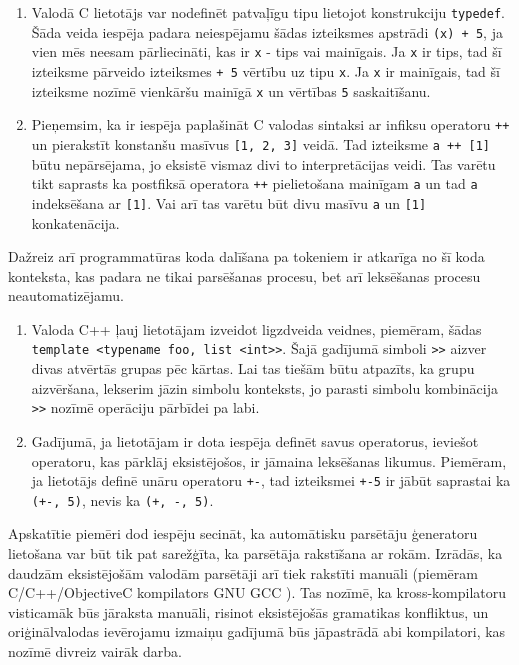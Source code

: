 \begin{enumerate}
\item
Valodā C lietotājs var nodefinēt patvaļīgu tipu lietojot konstrukciju \verb|typedef|. Šāda veida iespēja padara neiespējamu šādas izteiksmes apstrādi \verb|(x) + 5|, ja vien mēs neesam pārliecināti, kas ir \verb|x| - tips vai mainīgais. Ja \verb|x| ir tips, tad šī izteiksme pārveido izteiksmes \verb|+ 5| vērtību uz tipu \verb|x|. Ja \verb|x| ir mainīgais, tad šī izteiksme nozīmē vienkāršu mainīgā \verb|x| un vērtības \verb|5| saskaitīšanu. 
\item
Pieņemsim, ka ir iespēja paplašināt C valodas sintaksi ar infiksu operatoru \verb|++| un pierakstīt konstanšu masīvus \verb|[1, 2, 3]| veidā. Tad izteiksme \verb|a ++ [1]| būtu nepārsējama, jo eksistē vismaz divi to interpretācijas veidi. Tas varētu tikt saprasts ka postfiksā operatora \verb|++| pielietošana mainīgam \verb|a| un tad \verb|a| indeksēšana ar \verb|[1]|. Vai arī tas varētu būt divu masīvu \verb|a| un \verb|[1]| konkatenācija.
\end{enumerate}

Dažreiz arī programmatūras koda dalīšana pa tokeniem ir atkarīga no šī koda konteksta, kas padara ne tikai parsēšanas procesu, bet arī leksēšanas procesu neautomatizējamu.

\begin{enumerate}
\item
Valoda C++ ļauj lietotājam izveidot ligzdveida veidnes, piemēram, šādas \\ \verb|template <typename foo, list <int>>|. Šajā gadījumā simboli \verb|>>| aizver divas atvērtās grupas pēc kārtas. Lai tas tiešām būtu atpazīts, ka grupu aizvēršana, lekserim jāzin simbolu konteksts, jo parasti simbolu kombinācija \verb|>>| nozīmē operāciju pārbīdei pa labi.
\item
Gadījumā, ja lietotājam ir dota iespēja definēt savus operatorus, ieviešot operatoru, kas pārklāj eksistējošos, ir jāmaina leksēšanas likumus. Piemēram, ja lietotājs definē unāru operatoru \verb|+-|, tad izteiksmei \verb|+-5| ir jābūt saprastai ka \verb|(+-, 5)|, nevis ka \verb|(+, -, 5)|.
\end{enumerate}

Apskatītie piemēri dod iespēju secināt, ka automātisku parsētāju ģeneratoru lietošana var būt tik pat sarežģīta, ka parsētāja rakstīšana ar rokām. Izrādās, ka daudzām eksistējošām valodām parsētāji arī tiek rakstīti manuāli (piemēram C/C++/ObjectiveC kompilators GNU GCC \cite{GCC}). Tas nozīmē, ka kross-kompilatoru visticamāk būs jāraksta manuāli, risinot eksistējošās gramatikas konfliktus, un oriģinālvalodas ievērojamu izmaiņu gadījumā būs jāpastrādā abi kompilatori, kas nozīmē divreiz vairāk darba. 


